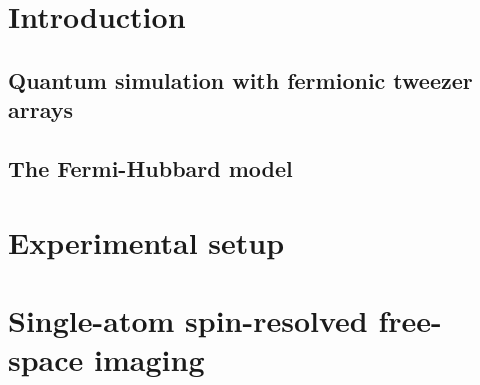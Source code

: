 \documentclass[twoside]{article}
\begin{document}








\newpage
\section{Introduction} \label{sec:intro}
\subsection{Quantum simulation with fermionic tweezer arrays}

\subsection{The Fermi-Hubbard model} \label{subsec:exp-setup-fh}




\newpage
\section{Experimental setup} \label{sec:exp-setup}





\newpage
\section{Single-atom spin-resolved free-space imaging} \label{sec:imaging}

\end{document}
